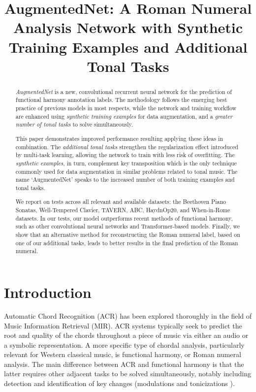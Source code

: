 \documentclass{article}
\title{AugmentedNet: A Roman Numeral Analysis Network with Synthetic Training Examples and Additional Tonal Tasks}
\newcommand{\guide}[1]{}
\begin{document}
%
\maketitle
%
\begin{abstract}

\textit{AugmentedNet} is a new, convolutional recurrent neural network for the prediction of functional harmony annotation labels.
The methodology follows the emerging best practice of previous models in most respects, while the network and training workflow are enhanced using \textit{synthetic training examples} for data augmentation, and a \textit{greater number of tonal tasks} to solve simultaneously.

This paper demonstrates improved performance resulting applying these ideas in combination.
The \textit{additional tonal tasks} strengthen the regularization effect introduced by multi-task learning, allowing the network to train with less risk of overfitting. 
The \textit{synthetic examples}, in turn, complement key transposition which is the only technique commonly used for data augmentation in similar problems related to tonal music.
The name `AugmentedNet' speaks to the increased number of both training examples and tonal tasks.

We report on tests across all relevant and available datasets: the Beethoven Piano Sonatas, Well-Tempered Clavier, TAVERN, ABC, HaydnOp20, and When-in-Rome datasets.
In our tests, our model outperforms recent methods of functional harmony, such as other convolutional neural networks and Transformer-based models.
Finally, we show that an alternative method for reconstructing the Roman numeral label, based on one of our additional tasks, leads to better results in the final prediction of the Roman numeral.
\end{abstract}
%
\section{Introduction}\label{sec:introduction}

\guide{RNA versus chord recognition.}
Automatic Chord Recognition (ACR) has been explored thoroughly in the field of Music Information Retrieval (MIR). 
ACR systems typically seek to predict the root and quality of the chords throughout a piece of music via either an audio or a symbolic representation.
A more specific type of chordal analysis, particularly relevant for Western classical music, is functional harmony, or Roman numeral analysis. 
The main difference between ACR and functional harmony is that the latter requires other adjacent tasks to be solved simultaneously, notably including detection and identification of key changes (modulations \cite{feisthauer2020estimating, schreiber2020local} and tonicizations \cite{napoleslopez2020local}).
\end{document}
